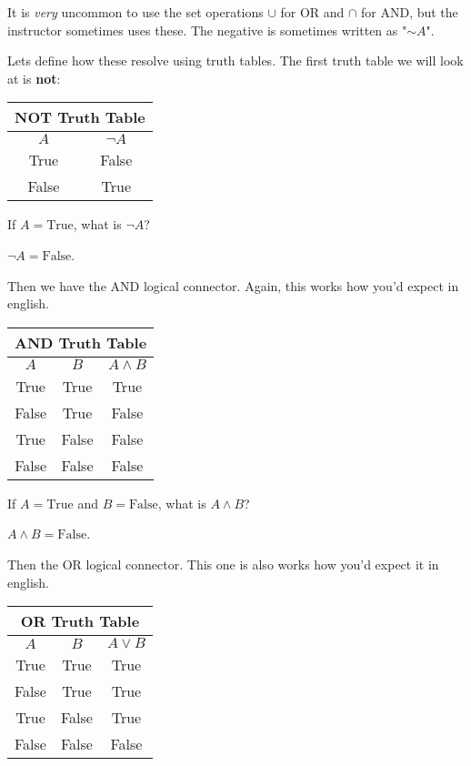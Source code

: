 \begin{boxnotation*}{}{}
	It is \emph{very} uncommon to use the set operations $\cup$ for OR and $\cap$ for AND, but the instructor sometimes uses these. The negative is sometimes written as "$\sim A$".
\end{boxnotation*}

Lets define how these resolve using truth tables. The first truth table we will look at is {\bf not}:

\medskip
\begin{tabular}{c|c}
	\hline
	\multicolumn{2}{c}{NOT Truth Table}\\
	\hline
	$A$ & $\neg A$\\
	\hline
	True & False\\
	False & True\\
	\hline
\end{tabular}
\medskip

\begin{boxexample}{}{}
	If $A=\text{True}$, what is $\neg A$?
	
	$\neg A=\text{False}$.
\end{boxexample}

Then we have the AND logical connector. Again, this works how you'd expect in english.

\medskip
\begin{tabular}{c|c|c}
	\hline
	\multicolumn{3}{c}{AND Truth Table}\\
	\hline
	$A$ & $B$ & $A \land B$\\
	\hline
	True & True & True\\
	False & True & False\\
	True & False & False\\
	False & False & False\\
	\hline
\end{tabular}
\medskip

\begin{boxexample}{}{}
	If $A=\text{True}$ and $B=\text{False}$, what is $A \land B$?
	
	$A \land B = \text{False}$.
\end{boxexample}

Then the OR logical connector. This one is also works how you'd expect it in english.

\medskip
\begin{tabular}{c|c|c}
	\hline
	\multicolumn{3}{c}{OR Truth Table}\\
	\hline
	$A$ & $B$ & $A \lor B$\\
	\hline
	True & True & True\\
	False & True & True\\
	True & False & True\\
	False & False & False\\
	\hline
\end{tabular}
\medskip

